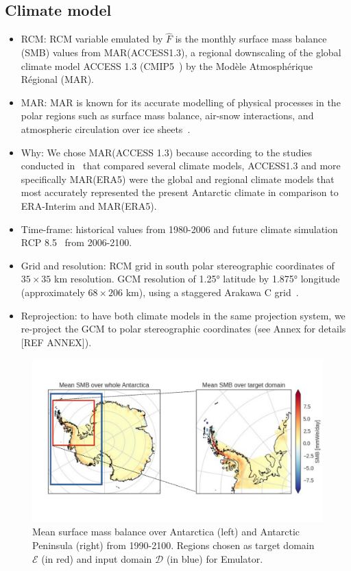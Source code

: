 \documentclass[a4paper,11pt,oneside]{report}
\begin{document}
\subsection{Climate model}
\begin{itemize}
    \item RCM: RCM variable emulated by $\hat{F}$ is the monthly surface mass balance (SMB) values from MAR(ACCESS1.3), a regional downscaling of the global climate model ACCESS 1.3 (CMIP5~\cite{ACCESS13, CMIP5}) by the Modèle Atmosphérique Régional (MAR). 
    \item MAR: MAR is known for its accurate modelling of physical processes in the polar regions such as surface mass balance, air-snow interactions, and atmospheric circulation over ice sheets~\cite{MAR}. 
    \item Why: We chose MAR(ACCESS 1.3) because according to the studies conducted in~\cite{Kittel, Agosta2015} that compared several climate models, ACCESS1.3 and more specifically MAR(ERA5) were the global and regional climate models that most accurately represented the present Antarctic climate in comparison to ERA-Interim and MAR(ERA5). 
    \item Time-frame: historical values from 1980-2006 and future climate simulation RCP 8.5~\cite{Moss2010} from 2006-2100. 
    \item Grid and resolution: RCM grid in south polar stereographic coordinates of $35 \times 35$ km resolution. GCM resolution of 1.25° latitude by 1.875° longitude (approximately $68 \times 206$ km), using a staggered Arakawa C grid~\cite{ACCESS13, ACCESS13_2}. 
    \item Reprojection: to have both climate models in the same projection system, we re-project the GCM to polar stereographic coordinates (see Annex for details [REF ANNEX]). 
\end{itemize}

\begin{figure}[!t]
  \centering
  \includegraphics[width=\columnwidth]{images/domains.pdf}
  \caption []{\small Mean surface mass balance over Antarctica (left) and Antarctic Peninsula (right) from 1990-2100. Regions chosen as target domain $\mathcal{E}$ (in red) and input domain $\mathcal{D}$ (in blue) for Emulator.}
  \vspace{-3mm}
    \label{fig:region-of-choice}
\end{figure}
\end{document}
